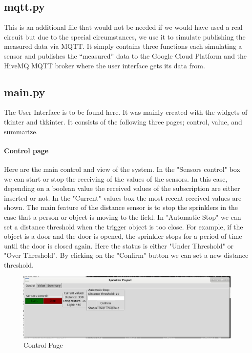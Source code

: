 \documentclass{article}
\begin{document}
\subsection{mqtt.py}
This is an additional file that would not be needed if we would have used a real circuit but due to the special circumstances, we use it to simulate publishing the measured data via MQTT. It simply contains three functions each simulating a sensor and publishes the \enquote{measured} data to the Google Cloud Platform and the HiveMQ MQTT broker where the user interface gets its data from.
\subsection{main.py}
The User Interface is to be found here. It was mainly created with the widgets of tkinter and tkkinter. It consists of the following three pages; control, value, and summarize.
\paragraph{Control page}
Here are the main control and view of the system. In the "Sensors control" box we can start or stop the receiving of the values of the sensors. In this case, depending on a boolean value the received values of the subscription are either inserted or not. In the "Current" values box the most recent received values are shown. The main feature of the distance sensor is to stop the sprinklers in the case that a person or object is moving to the field. In "Automatic Stop" we can set a distance threshold when the trigger object is too close. For example, if the object is a door and the door is opened, the sprinkler stops for a period of time until the door is closed again. Here the status is either "Under Threshold" or "Over Threshold". By clicking on the "Confirm" button we can set a new distance threshold.
\begin{figure}
\centering
\includegraphics[scale=0.3]{control_view.png}
\caption{Control Page}
\label{fig:control}
\end{figure}
\end{document}
